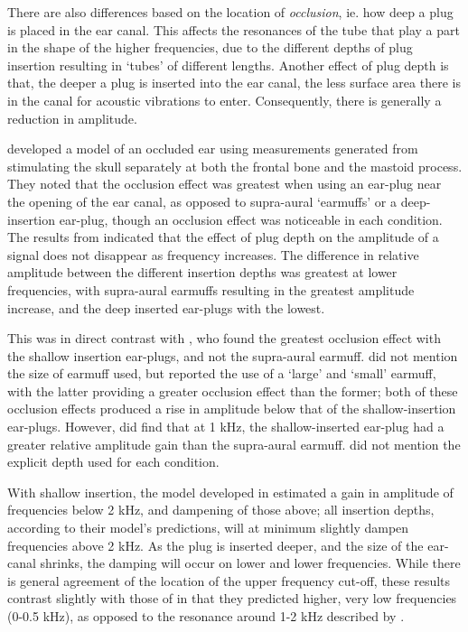 There are also differences based on the location of \textit{occlusion}, ie. how deep a plug is placed in the ear canal.  This affects the resonances of the tube that play a part in the shape of the higher frequencies, due to the different depths of plug insertion resulting in `tubes' of different lengths.  Another effect of plug depth is that, the deeper a plug is inserted into the ear canal, the less surface area there is in the canal for acoustic vibrations to enter.  Consequently, there is generally a reduction in amplitude.

\cite{stenfelt:07} developed a model of an occluded ear using measurements generated from stimulating the skull separately at both the frontal bone and the mastoid process.
%
%
They noted that the occlusion effect was greatest when using an ear-plug near the opening of the ear canal, as opposed to supra-aural `earmuffs' or a deep-insertion ear-plug, though an occlusion effect was noticeable in each condition.
The results from \cite{dean:00} indicated that the effect of plug depth on the amplitude of a signal does not disappear as frequency increases. The difference in relative amplitude between the different insertion depths was greatest at lower frequencies, with supra-aural earmuffs resulting in the greatest amplitude increase, and the deep inserted ear-plugs with the lowest.

This was in direct contrast with \cite{stenfelt:07}, who found the greatest occlusion effect with the shallow insertion ear-plugs, and not the supra-aural earmuff.  \cite{dean:00} did not mention the size of earmuff used, but \cite{stenfelt:07} reported the use of a `large' and `small' earmuff, with the latter providing a greater occlusion effect than the former; both of these occlusion effects produced a rise in amplitude below that of the shallow-insertion ear-plugs.
However, \cite{dean:00} did find that at 1 kHz, the shallow-inserted ear-plug had a greater relative amplitude gain than the supra-aural earmuff.  \cite{dean:00} did not mention the explicit depth used for each condition. 


With shallow insertion, the model developed in \cite{stenfelt:07} estimated a gain in amplitude of frequencies below 2 kHz, and dampening of those above; all insertion depths, according to their model's predictions, will at minimum slightly dampen frequencies above 2 kHz.  As the plug is inserted deeper, and the size of the ear-canal shrinks, the damping will occur on lower and lower frequencies.  While there is general agreement of the location of the upper frequency cut-off, these results contrast slightly with those of \cite{bekesy:60}%
in that they predicted higher, very low frequencies (0-0.5 kHz), as opposed to the resonance around 1-2 kHz described by \cite{bekesy:60}. %


